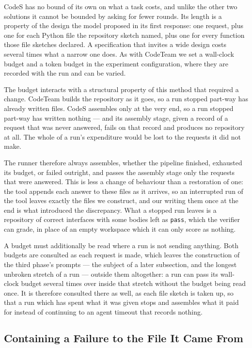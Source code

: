 CodeS has no bound of its own on what a task costs, and unlike the other two
solutions it cannot be bounded by asking for fewer rounds. Its length is a
property of the design the model proposed in its first response: one request,
plus one for each Python file the repository sketch named, plus one for every
function those file sketches declared. A specification that invites a wide
design costs several times what a narrow one does. As with CodeTeam we set a
wall-clock budget and a token budget in the experiment configuration, where
they are recorded with the run and can be varied.

The budget interacts with a structural property of this method that required a
change. CodeTeam builds the repository as it goes, so a run stopped part-way
has already written files. CodeS assembles only at the very end, so a run
stopped part-way has written nothing --- and its assembly stage, given a record
of a request that was never answered, fails on that record and produces no
repository at all. The whole of a run's expenditure would be lost to the
requests it did not make.

The runner therefore always assembles, whether the pipeline finished, exhausted
its budget, or failed outright, and passes the assembly stage only the requests
that were answered. This is less a change of behaviour than a restoration of
one: the tool appends each answer to these files as it arrives, so an
interrupted run of the tool leaves exactly the files we construct, and our
writing them once at the end is what introduced the discrepancy. What a stopped
run leaves is a repository of correct interfaces with some bodies left as
\texttt{pass}, which the verifier can grade, in place of an empty workspace
which it can only score as nothing.

A budget must additionally be read where a run is not sending anything. Both
budgets are consulted as each request is made, which leaves the construction of
the third phase's prompts --- the subject of a later subsection, and the
longest unbroken stretch of a run --- outside them altogether: a run can pass
its wall-clock budget several times over inside that stretch without the budget
being read once. It is therefore consulted there as well, as each file sketch
is taken up, so that a run which has spent what it was given stops and
assembles what it paid for instead of continuing to an agent timeout that
records nothing.

\subsection{Containing a Failure to the File It Came From}

